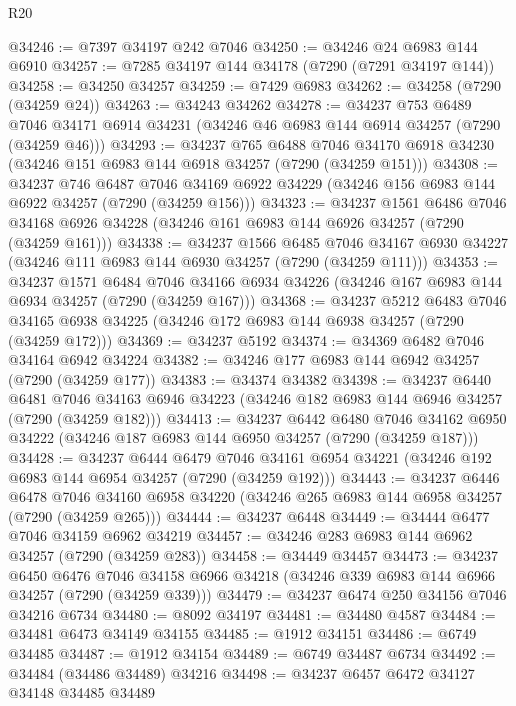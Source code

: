 \begin{lexlean}{R20}
\begin{coremodule}
{@34246 := @7397 @34197 @242 @7046
@34250 := @34246 @24 @6983 @144 @6910
@34257 := @7285 @34197 @144 @34178 (@7290 (@7291 @34197 @144))
@34258 := @34250 @34257
@34259 := @7429 @6983
@34262 := @34258 (@7290 (@34259 @24))
@34263 := @34243 @34262
@34278 := @34237
    @753
    @6489
    @7046
    @34171
    @6914
    @34231
    (@34246 @46 @6983 @144 @6914 @34257 (@7290 (@34259 @46)))
@34293 := @34237
    @765
    @6488
    @7046
    @34170
    @6918
    @34230
    (@34246 @151 @6983 @144 @6918 @34257 (@7290 (@34259 @151)))
@34308 := @34237
    @746
    @6487
    @7046
    @34169
    @6922
    @34229
    (@34246 @156 @6983 @144 @6922 @34257 (@7290 (@34259 @156)))
@34323 := @34237
    @1561
    @6486
    @7046
    @34168
    @6926
    @34228
    (@34246 @161 @6983 @144 @6926 @34257 (@7290 (@34259 @161)))
@34338 := @34237
    @1566
    @6485
    @7046
    @34167
    @6930
    @34227
    (@34246 @111 @6983 @144 @6930 @34257 (@7290 (@34259 @111)))
@34353 := @34237
    @1571
    @6484
    @7046
    @34166
    @6934
    @34226
    (@34246 @167 @6983 @144 @6934 @34257 (@7290 (@34259 @167)))
@34368 := @34237
    @5212
    @6483
    @7046
    @34165
    @6938
    @34225
    (@34246 @172 @6983 @144 @6938 @34257 (@7290 (@34259 @172)))
@34369 := @34237 @5192
@34374 := @34369 @6482 @7046 @34164 @6942 @34224
@34382 := @34246 @177 @6983 @144 @6942 @34257 (@7290 (@34259 @177))
@34383 := @34374 @34382
@34398 := @34237
    @6440
    @6481
    @7046
    @34163
    @6946
    @34223
    (@34246 @182 @6983 @144 @6946 @34257 (@7290 (@34259 @182)))
@34413 := @34237
    @6442
    @6480
    @7046
    @34162
    @6950
    @34222
    (@34246 @187 @6983 @144 @6950 @34257 (@7290 (@34259 @187)))
@34428 := @34237
    @6444
    @6479
    @7046
    @34161
    @6954
    @34221
    (@34246 @192 @6983 @144 @6954 @34257 (@7290 (@34259 @192)))
@34443 := @34237
    @6446
    @6478
    @7046
    @34160
    @6958
    @34220
    (@34246 @265 @6983 @144 @6958 @34257 (@7290 (@34259 @265)))
@34444 := @34237 @6448
@34449 := @34444 @6477 @7046 @34159 @6962 @34219
@34457 := @34246 @283 @6983 @144 @6962 @34257 (@7290 (@34259 @283))
@34458 := @34449 @34457
@34473 := @34237
    @6450
    @6476
    @7046
    @34158
    @6966
    @34218
    (@34246 @339 @6983 @144 @6966 @34257 (@7290 (@34259 @339)))
@34479 := @34237 @6474 @250 @34156 @7046 @34216 @6734
@34480 := @8092 @34197
@34481 := @34480 @4587
@34484 := @34481 @6473 @34149 @34155
@34485 := @1912 @34151
@34486 := @6749 @34485
@34487 := @1912 @34154
@34489 := @6749 @34487 @6734
@34492 := @34484 (@34486 @34489) @34216
@34498 := @34237 @6457 @6472 @34127 @34148 @34485 @34489
}
\end{coremodule}
\end{lexlean}
